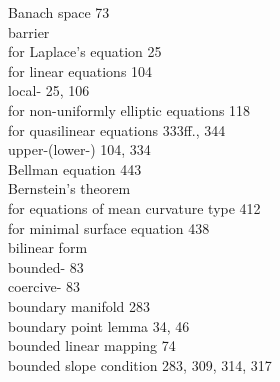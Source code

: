 \begin{flushleft}
Banach space \hspace{1em} 73\\
barrier\\
\hspace*{1.5em} for Laplace's equation \hspace{1em} 25\\
\hspace*{1.5em} for linear equations \hspace{1em} 104\\
\hspace*{1.5em} local- \hspace{1em} 25, 106\\
\hspace*{1.5em} for non-uniformly elliptic equations \hspace{1em} 118\\
\hspace*{1.5em} for quasilinear equations \hspace{1em} 333ff., 344\\
\hspace*{1.5em} upper-(lower-) \hspace{1em} 104, 334\\
Bellman equation \hspace{1em} 443\\
Bernstein's theorem\\
\hspace*{1.5em} for equations of mean curvature type \hspace{1em} 412\\
\hspace*{1.5em} for minimal surface equation \hspace{1em} 438\\
bilinear form\\
\hspace*{1.5em} bounded- \hspace{1em} 83\\
\hspace*{1.5em} coercive- \hspace{1em} 83\\
boundary manifold \hspace{1em} 283\\
boundary point lemma \hspace{1em} 34, 46\\
bounded linear mapping \hspace{1em} 74\\
bounded slope condition \hspace{1em} 283, 309, 314, 317\\

\end{flushleft}
